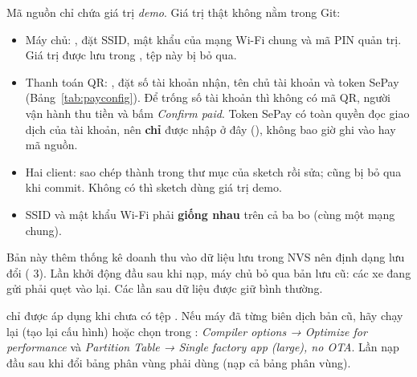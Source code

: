 \begin{lydo}
Mã nguồn chỉ chứa giá trị \emph{demo}. Giá trị thật không nằm trong Git:
\begin{itemize}[nosep]
  \item Máy chủ: , đặt SSID, mật
        khẩu của mạng Wi-Fi chung và mã PIN quản trị. Giá trị
        được lưu trong , tệp này bị  bỏ qua.
  \item Thanh toán QR: , đặt số tài
        khoản nhận, tên chủ tài khoản và token SePay (Bảng~\ref{tab:payconfig}). Để trống
        số tài khoản thì không có mã QR, người vận hành thu tiền và bấm \emph{Confirm paid}. Token SePay có toàn quyền đọc giao dịch của tài
        khoản, nên \textbf{chỉ} được nhập ở đây (), không bao giờ ghi vào
         hay mã nguồn.
  \item Hai client: sao chép  thành  trong thư mục
        của sketch rồi sửa;  cũng bị bỏ qua khi commit. Không có
         thì sketch dùng giá trị demo.
  \item SSID và mật khẩu Wi-Fi phải \textbf{giống nhau} trên cả ba bo (cùng một mạng chung).
\end{itemize}
\end{lydo}

\begin{lydo}
Bản này thêm thống kê doanh thu vào dữ liệu lưu trong NVS nên định dạng lưu đổi
( 3). Lần khởi động đầu sau khi nạp, máy chủ bỏ qua bản lưu
cũ: các xe đang gửi phải quẹt vào lại. Các lần sau dữ liệu được giữ bình thường.
\end{lydo}

\begin{lydo}
 chỉ được áp dụng khi chưa có tệp .
Nếu máy đã từng biên dịch bản cũ, hãy chạy lại  (tạo lại
cấu hình) hoặc chọn trong : \emph{Compiler options → Optimize for
performance} và \emph{Partition Table → Single factory app (large), no OTA}. Lần nạp
đầu sau khi đổi bảng phân vùng phải dùng  (nạp cả bảng phân vùng).
\end{lydo}

